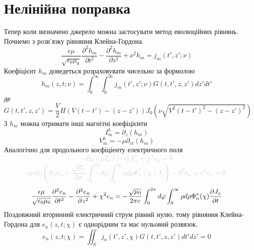 \section{Нелінійна поправка}
%
Тепер коли визначено джерело можна застосувати метод еволюційних рівнянь.
Почнемо з розв'язку рівняння Клейна-Гордона.
%
\begin{equation*}
\frac{\epsilon \mu}{ \sqrt{\epsilon_0 \mu_0}} 
\frac{\partial^2 h_m}{\partial t^2} - \frac{\partial^2 h_m}{\partial z^2} + 
\nu^2 h_m = j_m (t',z'; \nu)
\end{equation*}
%
Коефіцієнт $ h_m $ доведеться розраховувати чисельно за формолою
%
\begin{equation*}
h_m (z, t; \nu) = \int_{0}^{\infty} \int_{0}^{\infty}
j_m (t',z'; \nu) G(t,t',z,z') dz' dt'
\end{equation*}
%
де 
%
\begin{equation*}
G(t,t',z,z') = \frac{\mathit{V}}{2} H \left( \mathit{V} (t-t') - (z-z') \right)
J_0 \left( \nu \sqrt{\mathit{V}^2 (t-t')^2 - (z-z')^2} \right)
\end{equation*}
%
З $ h_m $ можна отримати інші магнітні коефіцієнти
%
\begin{equation*}
I_m^h = \partial_z (h_m)
\end{equation*}
%
\begin{equation*}
V_m^h = - \mu \partial_{ct} (h_m)
\end{equation*}
%
Аналогічно для продольного коєфіціенту електричного поля
%
\textcolor{lightgray}{ \begin{equation*}
- \partial_{ct}(\mu I_n^e) - \partial_z V_n^e + \chi^2 e_n = 0
\end{equation*} }
%
\textcolor{lightgray}{ \begin{equation*}
\epsilon \mu \partial_{ct} \left( \partial_{ct} e_n + 
\frac{\sqrt{\mu_0}}{2 \pi} \int_0^{2\pi} d \varphi 
\int_0^{\infty} \rho d \rho \Phi_n^* (\chi) J_z \right) - 
\partial^2_z e_n + \chi^2 e_n = 0
\end{equation*} }
%
\begin{equation*}
\frac{\epsilon \mu}{ \sqrt{\epsilon_0 \mu_0}} 
\frac{\partial^2 e_n}{\partial t^2} - 
\frac{\partial^2 e_n}{\partial z^2} + \chi^2 e_n = 
- \frac{\sqrt{\mu_0}}{2 \pi c} 
\int_0^{2\pi} d \varphi 
\int_0^{\infty} \rho d \rho \Phi_n^* (\chi) \frac{\partial J_z}{\partial t}
\end{equation*}
%
Поздовжний вторинний електричний струм рівний нулю, тому рівняння 
Клейна-Гордона для $ e_n (z, t; \chi) $ є однорідним та має нульовий розвязок.
%
\begin{equation*}
e_n (z, t; \chi) = \iint_S j_n (t',z', \chi) G(t,t',z,z') dt' dz' = 0
\end{equation*}
